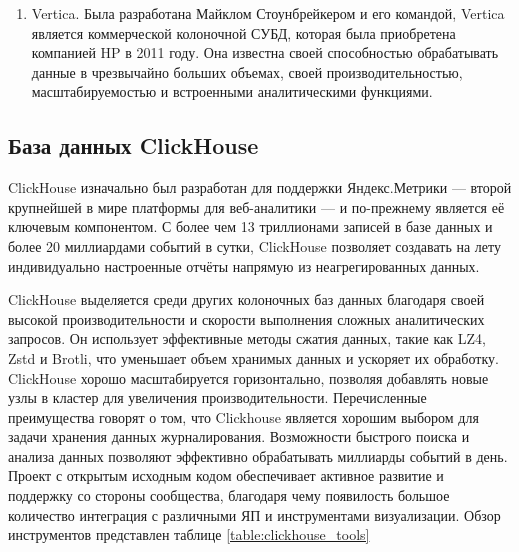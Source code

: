 \documentclass[14pt, russian]{scrartcl}
\begin{document}
\begin{enumerate}
	\item{Vertica. Была разработана Майклом Стоунбрейкером и его командой, Vertica является коммерческой колоночной СУБД, которая была приобретена компанией HP в 2011 году. Она известна своей способностью обрабатывать данные в чрезвычайно больших объемах, своей производительностью, масштабируемостью и встроенными аналитическими функциями.}
\end{enumerate}


\subsection{База данных ClickHouse}

ClickHouse \cite{ClickDocs} изначально был разработан для поддержки Яндекс.Метрики
--- второй крупнейшей в мире платформы для веб-аналитики — и по-прежнему является её ключевым компонентом.
С более чем 13 триллионами записей в базе данных и более 20 миллиардами событий в сутки,
ClickHouse позволяет создавать на лету индивидуально настроенные отчёты напрямую из неагрегированных данных.

ClickHouse выделяется среди других колоночных баз данных благодаря своей высокой производительности
и скорости выполнения сложных аналитических запросов.
Он использует эффективные методы сжатия данных, такие как LZ4, Zstd и Brotli,
что уменьшает объем хранимых данных и ускоряет их обработку.
ClickHouse хорошо масштабируется горизонтально, позволяя добавлять
новые узлы в кластер для увеличения производительности.
Перечисленные преимущества говорят о том, что Clickhouse является
хорошим выбором для задачи хранения данных журналирования. Возможности быстрого поиска
и анализа данных позволяют эффективно обрабатывать миллиарды событий в день.
Проект с открытым исходным кодом обеспечивает активное развитие и поддержку
со стороны сообщества, благодаря чему появилость большое количество интеграция
с различными ЯП и инструментами визуализации. Обзор инструментов представлен таблице \ref{table:clickhouse_tools}
\end{document}
